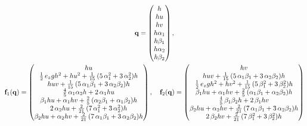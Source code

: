 \documentclass{article}
\begin{document}
      \begin{gather}
        \mathbf{q} =
        \begin{pmatrix}
          h \\
          hu \\
          hv \\
          h \alpha_1 \\
          h \beta_1 \\
          h \alpha_2 \\
          h \beta_2
        \end{pmatrix}, \\
        \mathbf{f}_1(\mathbf{q}) =
        \begin{pmatrix}
          h u \\
          \frac{1}{2} \, e_{z} g h^{2} + h u^{2} + \frac{1}{15} \, {(5 \, \alpha_{1}^{2} + 3 \, \alpha_{2}^{2})} h \\
          h u v + \frac{1}{15} \, {(5 \, \alpha_{1} \beta_{1} + 3 \, \alpha_{2} \beta_{2})} h \\
          \frac{4}{5} \, \alpha_{1} \alpha_{2} h + 2 \, \alpha_{1} h u \\
          \beta_{1} h u + \alpha_{1} h v + \frac{2}{5} \, {(\alpha_{2} \beta_{1} + \alpha_{1} \beta_{2})} h \\
          2 \, \alpha_{2} h u + \frac{2}{21} \, {(7 \, \alpha_{1}^{2} + 3 \, \alpha_{2}^{2})} h \\
          \beta_{2} h u + \alpha_{2} h v + \frac{2}{21} \, {(7 \, \alpha_{1} \beta_{1} + 3 \, \alpha_{2} \beta_{2})} h
        \end{pmatrix}, \quad
        \mathbf{f}_2(\mathbf{q}) =
        \begin{pmatrix}
          h v \\
          h u v + \frac{1}{15} \, {(5 \, \alpha_{1} \beta_{1} + 3 \, \alpha_{2} \beta_{2})} h \\
          \frac{1}{2} \, e_{z} g h^{2} + h v^{2} + \frac{1}{15} \, {(5 \, \beta_{1}^{2} + 3 \, \beta_{2}^{2})} h \\
          \beta_{1} h u + \alpha_{1} h v + \frac{2}{5} \, {(\alpha_{1} \beta_{1} + \alpha_{2} \beta_{2})} h \\
          \frac{4}{5} \, \beta_{1} \beta_{2} h + 2 \, \beta_{1} h v \\
          \beta_{2} h u + \alpha_{2} h v + \frac{2}{21} \, {(7 \, \alpha_{1} \beta_{1} + 3 \, \alpha_{2} \beta_{2})} h \\
          2 \, \beta_{2} h v + \frac{2}{21} \, {(7 \, \beta_{1}^{2} + 3 \, \beta_{2}^{2})} h

\end{pmatrix}
\end{gather}
\end{document}
